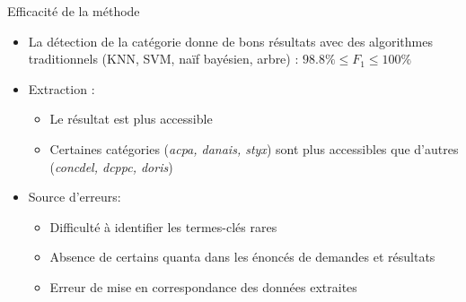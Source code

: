 \begin{frame}[t]{\mysubsectiontitle}
	Efficacité de la méthode
	\begin{itemize} \scriptsize
		\item La détection de la catégorie donne de bons résultats avec des algorithmes traditionnels (KNN, SVM, naïf bayésien, arbre) : $98.8\% \leq F_1 \leq 100\%$
		\item Extraction :
		{}
		\begin{itemize} \scriptsize
			\item Le résultat est plus accessible 
			\item Certaines catégories (\textit{acpa, danais, styx}) sont plus accessibles que d'autres (\textit{concdel, dcppc, doris})
		\end{itemize}				
		\item Source d'erreurs:
		\begin{itemize} \scriptsize
			\item Difficulté à identifier les termes-clés rares
			\item Absence de certains quanta dans les énoncés de demandes et résultats
			\item Erreur de mise en correspondance des données extraites
		\end{itemize}
	\end{itemize}
\end{frame}
